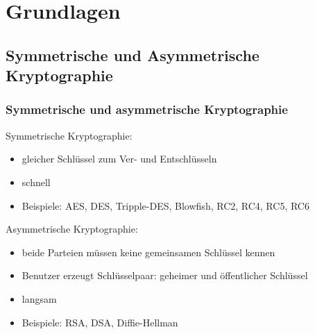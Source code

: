 \documentclass[10pt,compress]{beamer}
\begin{document}
\section{Grundlagen}
\subsection{Symmetrische und Asymmetrische Kryptographie}
\frame
{
    \frametitle{Symmetrische und asymmetrische Kryptographie}

    Symmetrische Kryptographie:
    \begin{itemize}
        \item gleicher Schlüssel zum Ver- und Entschlüsseln
        \item schnell
        \item Beispiele: AES, DES, Tripple-DES, Blowfish, RC2, RC4, RC5, RC6
    \end{itemize}

    \vfill

    Asymmetrische Kryptographie:
    \begin{itemize}
        \item beide Parteien müssen keine gemeinsamen Schlüssel kennen
        \item Benutzer erzeugt Schlüsselpaar: geheimer und öffentlicher Schlüssel
        \item langsam
        \item Beispiele: RSA, DSA, Diffie-Hellman
    \end{itemize}
}
\end{document}
